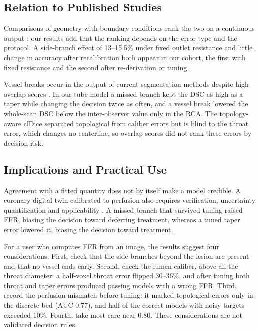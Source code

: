 \documentclass[journal,twoside,web]{ieeecolor}
\begin{document}
\subsection{Relation to Published Studies}
Comparisons of geometry with boundary conditions rank the two on a continuous output \cite{sankaran2016,tanade2022,korte2023};
our results add that the ranking depends on the error type and the protocol. A side-branch effect of 13--15.5\% under
fixed outlet resistance \cite{gamage2022} and little change in accuracy after recalibration \cite{gosling2020} both
appear in our cohort, the first with fixed resistance and the second after re-derivation or tuning.

Vessel breaks occur in the output of current segmentation methods despite high overlap scores \cite{bransby2026}.
In our tube model a missed branch kept the DSC as high as a taper while changing the decision twice as often, and a vessel break lowered the whole-scan DSC below the inter-observer value only in the RCA. The topology-aware clDice \cite{shit2021} separated topological from caliber errors but is blind to the throat error, which changes no centerline, so overlap scores did not rank these errors by decision risk.

\subsection{Implications and Practical Use}
Agreement with a fitted quantity does not by itself make a model credible. A coronary digital twin calibrated to perfusion also requires verification,
uncertainty quantification and applicability \cite{viceconti2025}. A missed branch that survived tuning raised FFR, biasing the decision toward
deferring treatment, whereas a tuned taper error lowered it, biasing the decision toward treatment.

For a user who computes FFR from an image, the results suggest four considerations. First, check that the side branches beyond the lesion are present and that no vessel ends early.
Second, check the lumen caliber, above all the throat diameter: a half-voxel throat error flipped 30--36\%, and after tuning both throat and taper errors produced passing models with a wrong FFR. Third, record the perfusion mismatch before tuning: it marked topological errors only in the discrete bed (AUC 0.77), and half of the correct models with noisy targets exceeded 10\%. Fourth, take most care near 0.80. These considerations are not validated decision rules.
\end{document}
